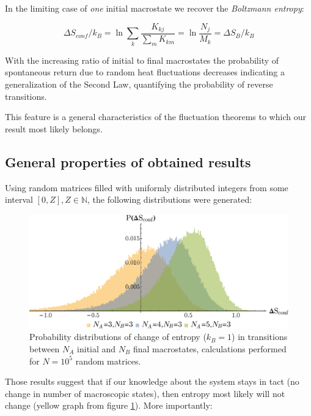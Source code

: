 \documentclass[a0]{sciposter}
\begin{document}
\begin{multicols}{3}
\begin{flushleft}
In the limiting case of \textit{one} initial macrostate we recover the \textit{Boltzmann entropy}:

\begin{equation}
\Delta S_{conf} /k_B = \ln{\sum_{k} \frac{K_{kj}}{\sum_m K_{km}}} = \ln{\frac{N_j}{M_k}} =\Delta S_{B} /k_B
\end{equation}
\vspace{0.5cm}

With the increasing ratio of initial to final macrostates the probability of spontaneous return due to random heat fluctuations decreases indicating a generalization of the Second Law, quantifying the probability of reverse transitions. 
\vspace{0.5cm}

This feature is a general characteristics of the fluctuation theorems to which our result most likely belongs.
\end{flushleft}
\columnbreak
\begin{flushleft}
\section{General properties of obtained results}
Using random matrices filled with uniformly distributed integers from some interval $[0,Z], Z \in \mathbb{N}$, the following distributions were generated:

\begin{minipage}[b]{22.0cm}
\centering
\begin{figure}[ht!]
\includegraphics[width=22cm]{Figure2.eps} \caption{Probability distributions of change of entropy ($k_B =1$) in transitions between $N_A$ initial and $N_B$ final macrostates, calculations performed for $N=10^5$ random matrices.}
\label{Fig2} 
\end{figure}
\end{minipage}
\vspace{-0.5cm} 

Those results suggest that if our knowledge about the system stays in tact (no change in number of macroscopic states), then entropy most likely will not change (yellow graph from figure \ref{Fig2}). More importantly:


\end{flushleft}
\end{multicols}
\end{document}
